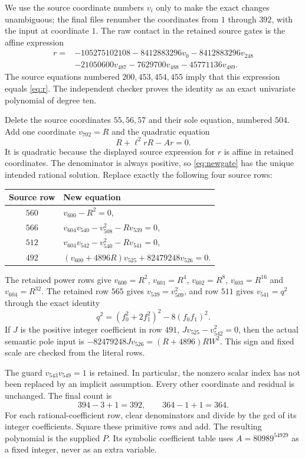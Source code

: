 \documentclass[11pt,a4paper]{article}
\theoremstyle{definition}\newtheorem{definition}[theorem]{Definition}
\theoremstyle{remark}\newtheorem{remark}[theorem]{Remark}
\begin{document}
We use the source coordinate numbers $v_i$ only to make the exact
changes unambiguous; the final files renumber the coordinates from
$1$ through $392$, with the input at coordinate $1$. The raw contact
in the retained source gates is the affine expression
\begin{align*}
 r={}&-105275102108-8412883296v_0-8412883296v_{248}\\
     &-21050600v_{487}-7629700v_{488}-45771136v_{489}.
\end{align*}
The source equations numbered $200,453,454,455$ imply that this
expression equals \eqref{eq:r}. The independent checker proves the
identity as an exact univariate polynomial of degree ten.

Delete the source coordinates $55,56,57$ and their sole equation,
numbered $504$. Add one coordinate $v_{702}=R$ and the quadratic equation
\begin{equation}\label{eq:newgate}
                 R+\ell^2rR-Ar=0.
\end{equation}
It is quadratic because the displayed source expression for $r$ is
affine in retained coordinates. The denominator is always positive,
so \eqref{eq:newgate} has the unique intended rational solution.
Replace exactly the following four source rows:
\begin{center}
\begin{tabular}{cl}
\toprule Source row & New equation \\\midrule
$560$ & $v_{600}-R^2=0$,\\
$566$ & $v_{604}v_{540}-v_{508}^2-Rv_{539}=0$,\\
$512$ & $v_{604}v_{542}-v_{540}^2-Rv_{541}=0$,\\
$492$ & $(v_{600}+4896R)v_{525}+82479248v_{526}=0$.\\
\bottomrule
\end{tabular}
\end{center}
The retained power rows give
$v_{600}=R^2$, $v_{601}=R^4$, $v_{602}=R^8$,
$v_{603}=R^{16}$ and $v_{604}=R^{32}$.
The retained row $565$ gives $v_{539}=v_{509}^2$, and row $511$
gives $v_{541}=q^2$ through the exact identity
\[
 q^2=(f_0^2+2f_1^2)^2-8(f_0f_1)^2.
\]
If $J$ is the positive integer coefficient in row $491$,
$Jv_{525}-v_{542}^2=0$, then the actual semantic pole input is
$-82479248Jv_{526}=(R+4896)RW^2$.
This sign and fixed scale are checked from the literal rows.

The guard $v_{543}v_{549}=1$ is retained. In particular, the
nonzero scalar index has not been replaced by an implicit assumption.
Every other coordinate and residual is unchanged. The final count is
\[
               394-3+1=392,\qquad364-1+1=364.
\]
For each rational-coefficient row, clear denominators and divide by
the gcd of its integer coefficients. Square these primitive rows and
add. The resulting polynomial is the supplied $P$. Its symbolic
coefficient table uses $A=80989^{54929}$ as a fixed integer, never as
an extra variable.
\end{document}

